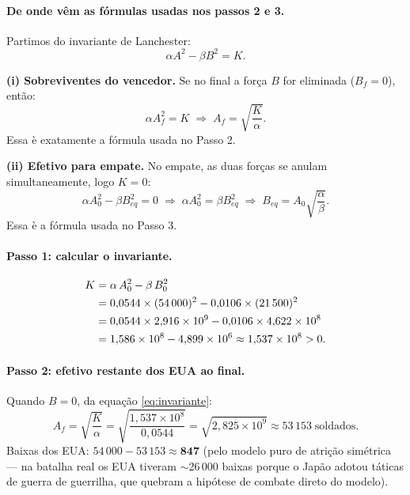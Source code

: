 \documentclass[12pt,a4paper]{article}
\theoremstyle{definition}
\newcommand{\resultado}[1]{%
  \begin{center}
    \fbox{\parbox{0.85\linewidth}{\centering $\displaystyle #1$}}
  \end{center}
}
\begin{document}
\paragraph{De onde v\^em as f\'ormulas usadas nos passos 2 e 3.}
Partimos do invariante de Lanchester:
\begin{equation}
  \alpha A^2 - \beta B^2 = K.
\end{equation}

\textbf{(i) Sobreviventes do vencedor.}
Se no final a for\c{c}a $B$ for eliminada ($B_f=0$), ent\~ao:
\begin{equation}
  \alpha A_f^2 = K
  \;\Rightarrow\;
  A_f = \sqrt{\frac{K}{\alpha}}.
\end{equation}
Essa \`e exatamente a f\'ormula usada no Passo 2.

\textbf{(ii) Efetivo para empate.}
No empate, as duas for\c{c}as se anulam simultaneamente, logo $K=0$:
\begin{equation}
  \alpha A_0^2 - \beta B_{eq}^2 = 0
  \;\Rightarrow\;
  \alpha A_0^2 = \beta B_{eq}^2
  \;\Rightarrow\;
  B_{eq} = A_0\sqrt{\frac{\alpha}{\beta}}.
\end{equation}
Essa \`e a f\'ormula usada no Passo 3.

\paragraph{Passo 1: calcular o invariante.}
\begin{align}
  K &= \alpha\,A_0^2 - \beta\,B_0^2 \notag\\
    &= 0{,}0544\times(54\,000)^2 - 0{,}0106\times(21\,500)^2 \notag\\
    &= 0{,}0544\times 2{,}916\times10^{9} - 0{,}0106\times 4{,}622\times10^{8} \notag\\
    &= 1{,}586\times10^{8} - 4{,}899\times10^{6} \approx 1{,}537\times10^{8} > 0.
\end{align}
\resultado{K \approx 1{,}54\times10^{8} > 0 \Rightarrow \text{EUA vence}}

\paragraph{Passo 2: efetivo restante dos EUA ao final.}
Quando $B = 0$, da equa\c{c}\~ao \eqref{eq:invariante}:
\begin{equation}
  A_f = \sqrt{\frac{K}{\alpha}} = \sqrt{\frac{1{,}537\times10^{8}}{0{,}0544}}
      = \sqrt{2{,}825\times10^{9}} \approx 53\,153\;\text{soldados.}
\end{equation}
Baixas dos EUA: $54\,000 - 53\,153 \approx \mathbf{847}$ (pelo modelo puro de
atri\c{c}\~ao sim\'etrica --- na batalha real os EUA tiveram $\sim$26\,000 baixas
porque o Jap\~ao adotou t\'aticas de guerra de guerrilha, que quebram a hip\'otese
de combate direto do modelo).
\end{document}
